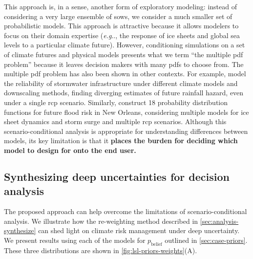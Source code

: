 \documentclass[11pt]{article}
\makeatletter
\DeclareRobustCommand\onedot{\futurelet\@let@token\@onedot}
\def\@onedot{\ifx\@let@token.\else.\null\fi\xspace}
\def\eg{\emph{e.g}\onedot} \def\Eg{\emph{E.g}\onedot}
\DeclareRobustCommand\onedot{\futurelet\@let@token\@onedot}
\def\@onedot{\ifx\@let@token.\else.\null\fi\xspace}
\def\eg{\emph{e.g}\onedot} \def\Eg{\emph{E.g}\onedot}
\makeatother
\begin{document}
This approach is, in a sense, another form of exploratory modeling: instead of considering a very large ensemble of \glspl{sow}, we consider a much smaller set of probabilistic models.
This approach is attractive because it allows modelers to focus on their domain expertise (\eg, the response of ice sheets and global sea levels to a particular climate future).
However, conditioning simulations on a set of climate futures and physical models presents what we term ``the multiple \gls{pdf} problem'' because it leaves decision makers with many \glspl{pdf} to choose from.
The multiple \gls{pdf} problem has also been shown in other contexts.
For example, \citet{sharma_rcp:2021} model the reliability of stormwater infrastructure under different climate models and downscaling methods, finding diverging estimates of future rainfall hazard, even under a single \gls{rcp} scenario.
Similarly, \citet{wong_nola:2017} construct 18 probability distribution functions for future flood risk in New Orleans, considering multiple models for ice sheet dynamics and storm surge and multiple \gls{rcp} scenarios.
Although this scenario-conditional analysis is appropriate for understanding differences between models, its key limitation is that it \textbf{places the burden for deciding which model to design for onto the end user.}

\subsection{Synthesizing deep uncertainties for decision analysis}\label{sec:results-synthesis}

The proposed approach can help overcome the limitations of scenario-conditional analysis.
We illustrate how the re-weighting method described in \cref{sec:analysis-synthesize} can shed light on climate risk management under deep uncertainty.
We present results using each of the models for $p_\mathrm{belief}$ outlined in \cref{sec:case-priors}.
These three distributions are shown in \cref{fig:lsl-priors-weights}(A).
\end{document}
